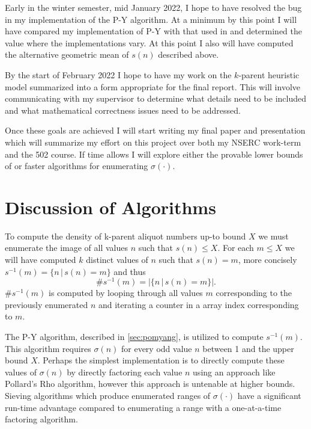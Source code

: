 \documentclass{article}
\theoremstyle{definition}
\begin{document}
Early in the winter semester, mid January 2022, I hope to have resolved the bug in my implementation of the P-Y algorithm. At a minimum by this point I will have compared my implementation of P-Y with that used in \cite{chum_guy_jacobson_mosunov_2018} and determined the value where the implementations vary. At this point I also will have computed the alternative geometric mean of $s(n)$ described above.

By the start of February 2022 I hope to have my work on the $k$-parent heuristic model summarized into a form appropriate for the final report. This will involve communicating with my supervisor to determine what details need to be included and what mathematical correctness issues need to be addressed. 

Once these goals are achieved I will start writing my final paper and presentation which will summarize my effort on this project over both my NSERC work-term and the 502 course. If time allows I will explore either the provable lower bounds of \cite{chen_zhao_2011} or faster algorithms for enumerating $\sigma(\cdot)$.  

\section{Discussion of Algorithms}
\label{sec:ennum}
To compute the density of k-parent aliquot numbers up-to bound $X$ we must enumerate the image of all values $n$ such that $s(n) \leq X$. For each $m \leq X$ we will have computed $k$ distinct values of $n$ such that $s(n) = m$, more concisely $s^{-1}(m) = \{n\,|\,s(n) = m\}$ and thus $$\#s^{-1}(m) = |\{n\,|\,s(n) = m\}|.$$ $\#s^{-1}(m)$ is computed by looping through all values $m$ corresponding to the previously enumerated $n$ and iterating a counter in a array index corresponding to $m$.

The P-Y algorithm, described in \autoref{sec:pomyang}, is utilized to compute $s^{-1}(m)$. This algorithm requires $\sigma(n)$ for every odd value $n$ between 1 and the upper bound $X$. Perhaps the simplest implementation is to directly compute these values of $\sigma(n)$ by directly factoring each value $n$ using an approach like Pollard's Rho algorithm, however this approach is untenable at higher bounds. Sieving algorithms which produce enumerated ranges of $\sigma(\cdot)$ have a significant run-time advantage compared to enumerating a range with a one-at-a-time factoring algorithm.
\end{document}

